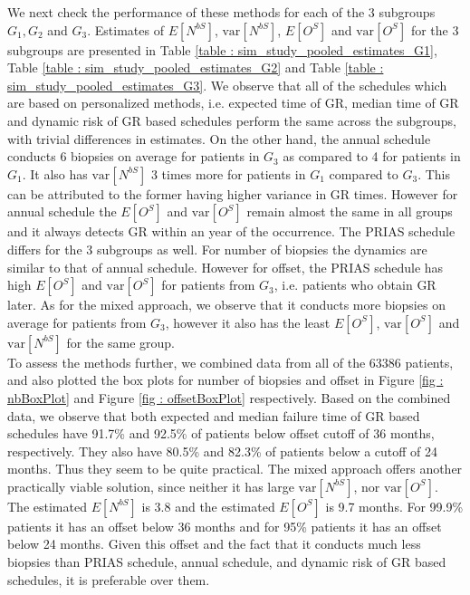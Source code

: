 We next check the performance of these methods for each of the 3 subgroups $G_1, G_2$ and $G_3$. Estimates of $E[N^{bS}]$, $\mbox{var}[N^{bS}]$, $E[O^S]$ and $\mbox{var}[O^S]$ for the 3 subgroups are presented in Table \ref{table : sim_study_pooled_estimates_G1}, Table \ref{table : sim_study_pooled_estimates_G2} and Table \ref{table : sim_study_pooled_estimates_G3}. We observe that all of the schedules which are based on personalized methods, i.e. expected time of GR, median time of GR and dynamic risk of GR based schedules perform the same across the subgroups, with trivial differences in estimates. On the other hand, the annual schedule conducts 6 biopsies on average for patients in $G_3$ as compared to 4 for patients in $G_1$. It also has $\mbox{var}[N^{bS}]$ 3 times more for patients in $G_1$ compared to $G_3$. This can be attributed to the former having higher variance in GR times. However for annual schedule the $E[O^S]$ and $\mbox{var}[O^S]$ remain almost the same in all groups and it always detects GR within an year of the occurrence. The PRIAS schedule differs for the 3 subgroups as well. For number of biopsies the dynamics are similar to that of annual schedule. However for offset, the PRIAS schedule has high $E[O^S]$ and $\mbox{var}[O^S]$ for patients from $G_3$, i.e. patients who obtain GR later. As for the mixed approach, we observe that it conducts more biopsies on average for patients from $G_3$, however it also has the least $E[O^S]$, $\mbox{var}[O^S]$ and $\mbox{var}[N^{bS}]$ for the same group.\\

To assess the methods further, we combined data from all of the 63386 patients, and also plotted the box plots for number of biopsies and offset in Figure \ref{fig : nbBoxPlot} and Figure \ref{fig : offsetBoxPlot} respectively. Based on the combined data, we observe that both expected and median failure time of GR based schedules have 91.7\% and 92.5\% of patients below offset cutoff of 36 months, respectively. They also have 80.5\% and 82.3\% of patients below a cutoff of 24 months. Thus they seem to be quite practical. The mixed approach offers another practically viable solution, since neither it has large $\mbox{var}[N^{bS}]$, nor $\mbox{var}[O^S]$. The estimated $E[N^{bS}]$ is 3.8 and the estimated $E[O^S]$ is 9.7 months. For 99.9\% patients it has an offset below 36 months and for 95\% patients it has an offset below 24 months. Given this offset and the fact that it conducts much less biopsies than PRIAS schedule, annual schedule, and dynamic risk of GR based schedules, it is preferable over them.

